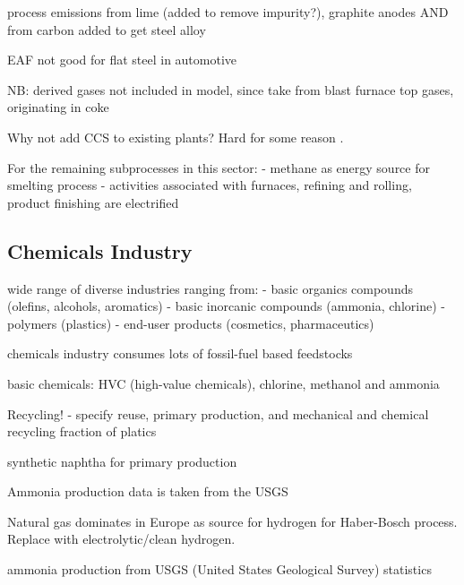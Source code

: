 process emissions from lime (added to remove impurity?), graphite anodes AND
from carbon added to get steel alloy  

EAF not good for flat steel in automotive

NB: derived gases not included in model, since take from blast furnace top
gases, originating in coke

Why not add CCS to existing plants? Hard for some reason .

For the remaining subprocesses in this sector:
- methane as energy source for smelting process
- activities associated with furnaces, refining and rolling, product finishing are electrified

\subsection{Chemicals Industry}


wide range of diverse industries ranging from:
- basic organics compounds (olefins, alcohols, aromatics)
- basic inorcanic compounds (ammonia, chlorine)
- polymers (plastics)
- end-user products (cosmetics, pharmaceutics)

chemicals industry consumes lots of fossil-fuel based feedstocks 

basic chemicals: HVC (high-value chemicals), chlorine, methanol and ammonia

Recycling!
- specify reuse, primary production, and mechanical and chemical recycling
fraction of platics


synthetic naphtha for primary production

Ammonia production data is taken from the USGS

Natural gas dominates in Europe as source for hydrogen for Haber-Bosch process.
Replace with electrolytic/clean hydrogen.


ammonia production from USGS (United States Geological Survey) statistics

